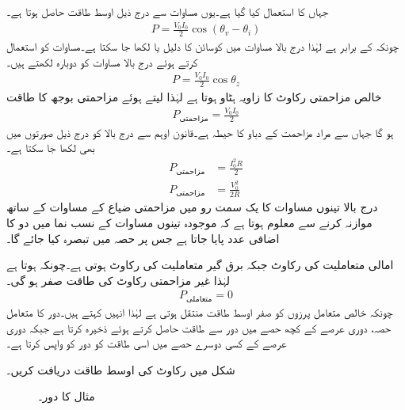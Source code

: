 جہاں  کا استعمال کیا گیا ہے۔یوں مساوات  سے درج ذیل اوسط طاقت حاصل  ہوتا ہے۔
\begin{align}\label{مساوات_طاقت_عمومی_الف}
P=\frac{V_0 I_0}{2}\cos(\theta_v-\theta_i)
\end{align}
چونکہ  کے برابر ہے لہٰذا درج بالا مساوات میں کوسائن کا دلیل  یا  لکھا جا سکتا ہے۔مساوات  کو استعمال کرتے ہوئے درج بالا مساوات کو دوبارہ لکھتے ہیں۔
\begin{align}\label{مساوات_طاقت_عمومی_ب}
P=\frac{V_0 I_0}{2}\cos \theta_z
\end{align}
خالص مزاحمتی رکاوٹ  کا زاویہ ہٹاو  ہوتا ہے لہٰذا  لیتے ہوئے مزاحمتی بوجھ کا طاقت
\begin{align}\label{مساوات_طاقت_مزاحمتی_طاقت_الف}
P_{\text{مزاحمتی}}=\frac{V_0 I_0}{2}
\end{align}
ہو گا جہاں  سے مراد مزاحمت کے دباو کا حیطہ ہے۔قانون اوہم سے درج بالا کو درج ذیل صورتوں میں بھی لکھا جا سکتا ہے۔
\begin{align}
P_{\text{مزاحمتی}}&=\frac{I^2_0 R}{2} \label{مساوات_طاقت_مزاحمتی_طاقت_ب}\\
P_{\text{مزاحمتی}}&=\frac{V^2_0}{2 R} \label{مساوات_طاقت_مزاحمتی_طاقت_پ}
\end{align}
درج بالا تینوں مساوات کا یک سمت رو میں مزاحمتی ضیاع کے مساوات کے ساتھ موازنہ کرنے سے معلوم ہوتا ہے کہ موجودہ تینوں مساوات کے نسب نما میں دو  کا اضافی عدد پایا جاتا ہے جس پر حصہ  میں  تبصرہ کیا جائے گا۔

امالی متعاملیت کی رکاوٹ  جبکہ برق گیر متعاملیت کی رکاوٹ  ہوتی ہے۔چونکہ  ہوتا ہے لہٰذا غیر مزاحمتی رکاوٹ کی طاقت صفر ہو گی۔
\begin{align}
P_{\text{متعاملی}} =0
\end{align}
چونکہ خالص متعامل پرزوں کو صفر اوسط طاقت منتقل ہوتی ہے لہٰذا انہیں  کہتے ہیں۔دور کا متعامل حصہ، دوری عرصے کے کچھ حصے میں  دور سے طاقت حاصل کرتے ہوئے  ذخیرہ کرتا ہے  جبکہ دوری عرصے کے کسی دوسرے حصے میں اسی طاقت کو دور کو واپس کرتا ہے۔

شکل  میں رکاوٹ کی اوسط طاقت دریافت کریں۔
\begin{figure}
\centering
{}
\caption{مثال  کا دور۔}
\label{مشق_طاقت_مزاحمت_امالہ_الف}
\end{figure}

